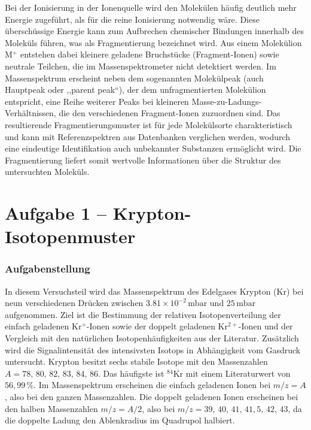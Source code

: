 \documentclass{article}
\begin{document}
Bei der Ionisierung in der Ionenquelle wird den Molekülen häufig deutlich
mehr Energie zugeführt, als für die reine Ionisierung notwendig wäre.
Diese überschüssige Energie kann zum Aufbrechen chemischer Bindungen
innerhalb des Moleküls führen, was als Fragmentierung bezeichnet wird.
Aus einem Molekülion M$^+$ entstehen dabei kleinere geladene Bruchstücke
(Fragment-Ionen) sowie neutrale Teilchen, die im Massenspektrometer nicht
detektiert werden. Im Massenspektrum erscheint neben dem sogenannten
Molekülpeak (auch Hauptpeak oder ,,parent peak``), der dem
unfragmentierten Molekülion entspricht, eine Reihe weiterer Peaks bei
kleineren Masse-zu-Ladungs-Verhältnissen, die den verschiedenen
Fragment-Ionen zuzuordnen sind. Das resultierende Fragmentierungsmuster
ist für jede Molekülsorte charakteristisch und kann mit Referenzspektren
aus Datenbanken verglichen werden, wodurch eine eindeutige Identifikation
auch unbekannter Substanzen ermöglicht wird. Die Fragmentierung liefert
somit wertvolle Informationen über die Struktur des untersuchten
Moleküls.





\section{Aufgabe 1 -- Krypton-Isotopenmuster}

\subsubsection*{Aufgabenstellung}

In diesem Versuchsteil wird das Massenspektrum des Edelgases Krypton (Kr)
bei neun verschiedenen Dr\"ucken zwischen $3.81 \times 10^{-2}\,\mathrm{mbar}$
und $25\,\mathrm{mbar}$ aufgenommen.
Ziel ist die Bestimmung der relativen Isotopenverteilung der einfach geladenen
Kr$^+$-Ionen sowie der doppelt geladenen Kr$^{2+}$-Ionen und der Vergleich
mit den nat\"urlichen Isotopenhäufigkeiten aus der Literatur.
Zus\"atzlich wird die Signalintensit\"at des intensivsten Isotops in
Abh\"angigkeit vom Gasdruck untersucht. Krypton besitzt sechs stabile Isotope mit den Massenzahlen
$A = 78,\,80,\,82,\,83,\,84,\,86$.
Das h\"aufigste ist $^{84}$Kr mit einem Literaturwert von $56{,}99\,\%$.
Im Massenspektrum erscheinen die einfach geladenen Ionen bei
$m/z = A$, also bei den ganzen Massenzahlen.
Die doppelt geladenen Ionen erscheinen bei den halben Massenzahlen
$m/z = A/2$, also bei $m/z = 39,\,40,\,41,\,41{,}5,\,42,\,43$,
da die doppelte Ladung den Ablenkradius im Quadrupol halbiert.
\end{document}
